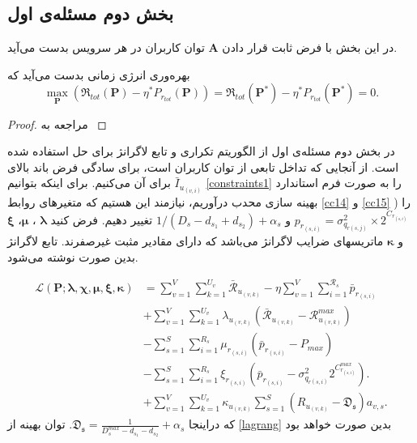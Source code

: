 \subsection{بخش دوم مسئله‌ی اول}\label{secondsub}
در این بخش با فرض ثابت قرار دادن  $\boldsymbol{A}$
توان کاربران در هر سرویس بدست می‌آید.
\begin{theorem}\label{t2}
	بهره‌وری انرژی زمانی بدست می‌آید که
	\begin{equation}\label{q2}
		\max \limits_{\boldsymbol{P}} (\mathfrak{R}_{tot}(\boldsymbol{P}) - \eta^* P_{r_{tot}}(\boldsymbol{P}))=
		\mathfrak{R}_{tot}(\boldsymbol{P}^*) - \eta^* P_{r_{tot}}(\boldsymbol{P}^*) =0.
	\end{equation}
\end{theorem}
\begin{proof}
	مراجعه به  \cite[]{aaa}
\end{proof}
در بخش دوم مسئله‌ی اول از الگوریتم تکراری و تابع لاگرانژ برای حل استفاده شده است. 
از آنجایی که تداخل تابعی از توان کاربران است، برای سادگی فرض باند بالای $\bar{I}_{u_{(v,i)}}$ برای آن می‌کنیم. برای اینکه بتوانیم 
\eqref{constraints1}
را به صورت فرم استاندارد بهینه سازی محدب درآوریم، نیازمند این هستیم که متغیرهای روابط
\eqref{cc14} 
و
\eqref{cc15}
 را   ($p_{r_{(s,i)}} = \sigma_{q_{r(s,j)}}^2\times 2^{C_{r_{(s,i)}}}$ و $1/(D_{s}- d_{s_1} + d_{s_2})+\alpha_s$ تغییر دهیم.
فرض کنید $\boldsymbol{\lambda}$ ، $\boldsymbol{\mu}$، $\boldsymbol{\xi}$ و $\boldsymbol{ \kappa}$  ماتریسهای ضرایب لاگرانژ می‌باشد که دارای مقادیر مثبت غیر‌صفرند. تابع لاگرانژ بدین صورت نوشته می‌شود.

\begin{subequations}\label{lagrang}
	\begin{alignat}{4}
		\mathcal{L}(\boldsymbol{P}; \boldsymbol{\lambda}, \boldsymbol{\chi}, \boldsymbol{\mu}, \boldsymbol{ \xi}, \boldsymbol{ \kappa}) & = \sum\limits_{v=1}^{V} \sum\limits_{k=1}^{U_v}\mathcal{\bar{R}}_{u_{(v,k)}}
		- \eta \sum\limits_{v=1}^{V} \sum\limits_{i=1}^{\mathcal{R}_s}\bar{p}_{r_{(s,i)}}\\
		&+\sum\limits_{v=1}^{V} \sum\limits_{k=1}^{U_v} \lambda_{u_{(v,k)}} (\mathcal{\bar{R}}_{u_{(v,k)}}-\mathcal{R}_{u_{(v,k)}}^{max})\\
		&- \sum\limits_{s=1}^{S} \sum\limits_{i=1}^{R_s} \mu_{r_{(s,i)}} (\bar{p}_{r_{(s,i)}}-P_{max})\\
		&- \sum\limits_{s=1}^{S} \sum\limits_{i=1}^{R_s} \xi_{r_{(s,i)}} (\bar{p}_{r_{(s,i)}}-\sigma_{q_{r(s,i)}}^2 2^{C_{r_{(s,i)}}^{max}}).\\
		&+ \sum\limits_{v=1}^{V} \sum\limits_{k=1}^{U_v} \kappa_{u_{(v,k)}} \sum\limits_{s=1}^{S}(R_{u_{(v,k)}} -\mathfrak{D_s})a_{v,s}.
	\end{alignat}
\end{subequations}
که دراینجا $\mathfrak{D_s}=\frac{1}{D_{s}^{max}-d_{s_1}-d_{s_2}}+\alpha_s$.
توان بهینه از \eqref{lagrang}
بدین صورت خواهد بود

